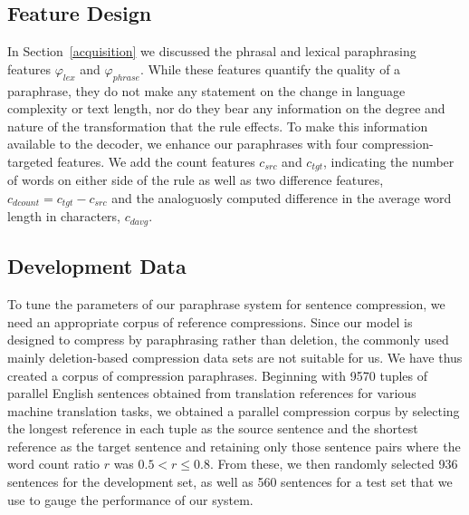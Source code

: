 \documentclass[11pt]{article}
\begin{document}
\subsection{Feature Design}
In Section~\ref{acquisition} we discussed the phrasal and lexical
paraphrasing features $\varphi_{\mathit{lex}}$ and
$\varphi_{\mathit{phrase}}$. While these features quantify the quality
of a paraphrase, they do not make any statement on the change in
language complexity or text length, nor do they bear any information
on the degree and nature of the transformation that the rule
effects. To make this information available to the decoder, we enhance
our paraphrases with four compression-targeted features. We add the
count features $c_{\mathit{src}}$ and $c_{\mathit{tgt}}$, indicating
the number of words on either side of the rule as well as two
difference features, $c_{\mathit{dcount}} = c_{\mathit{tgt}} -
c_{\mathit{src}}$ and the analoguosly computed difference in the
average word length in characters, $c_{\mathit{davg}}$.


\subsection{Development Data}
\label{dev-data}
To tune the parameters of our paraphrase system for sentence
compression, we need an appropriate corpus of reference
compressions. Since our model is designed to compress by paraphrasing
rather than deletion, the commonly used mainly deletion-based
compression data sets are not suitable for us. We have thus created a
corpus of compression paraphrases. Beginning with 9570 tuples of
parallel English sentences obtained from translation references for
various machine translation tasks, we obtained a parallel compression
corpus by selecting the longest reference in each tuple as the source
sentence and the shortest reference as the target sentence and
retaining only those sentence pairs where the word count ratio $r$ was
$0.5 < r \leq 0.8$. From these, we then randomly selected 936
sentences for the development set, as well as 560 sentences for a test
set that we use to gauge the performance of our system.
\end{document}
